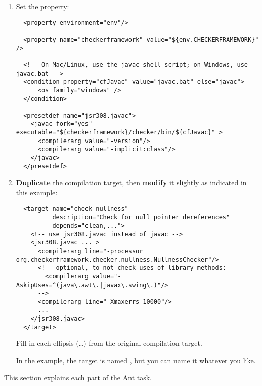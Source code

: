 \begin{enumerate}
\item
Set the  property:

\begin{smaller}
\begin{Verbatim}
  <property environment="env"/>

  <property name="checkerframework" value="${env.CHECKERFRAMEWORK}" />

  <!-- On Mac/Linux, use the javac shell script; on Windows, use javac.bat -->
  <condition property="cfJavac" value="javac.bat" else="javac">
      <os family="windows" />
  </condition>

  <presetdef name="jsr308.javac">
    <javac fork="yes" executable="${checkerframework}/checker/bin/${cfJavac}" >
      <compilerarg value="-version"/>
      <compilerarg value="-implicit:class"/>
    </javac>
  </presetdef>
\end{Verbatim}
\end{smaller}

\item \textbf{Duplicate} the compilation target, then \textbf{modify} it slightly as
indicated in this example:

\begin{smaller}
\begin{Verbatim}
  <target name="check-nullness"
          description="Check for null pointer dereferences"
          depends="clean,...">
    <!-- use jsr308.javac instead of javac -->
    <jsr308.javac ... >
      <compilerarg line="-processor org.checkerframework.checker.nullness.NullnessChecker"/>
      <!-- optional, to not check uses of library methods:
        <compilerarg value="-AskipUses=^(java\.awt\.|javax\.swing\.)"/>
      -->
      <compilerarg line="-Xmaxerrs 10000"/>
      ...
    </jsr308.javac>
  </target>
\end{Verbatim}
\end{smaller}

Fill in each ellipsis (\ldots) from the original compilation target.

In the example, the target is named , but you can
name it whatever you like.
\end{enumerate}


This section explains each part of the Ant task.

